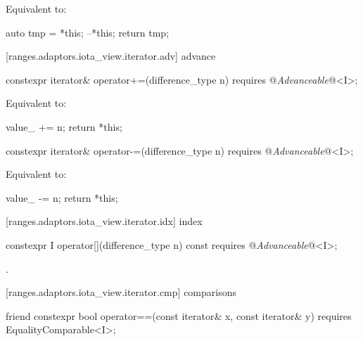 \begin{itemdescr}
\pnum
\effects Equivalent to:
\begin{codeblock}
auto tmp = *this;
--*this;
return tmp;
\end{codeblock}
\end{itemdescr}

[ranges.adaptors.iota_view.iterator.adv]{ advance}

\begin{itemdecl}
constexpr iterator& operator+=(difference_type n)
  requires @\textit{Advanceable}@<I>;
\end{itemdecl}

\begin{itemdescr}
\pnum
\effects Equivalent to:
\begin{codeblock}
value_ += n;
return *this;
\end{codeblock}
\end{itemdescr}

\begin{itemdecl}
constexpr iterator& operator-=(difference_type n)
  requires @\textit{Advanceable}@<I>;
\end{itemdecl}

\begin{itemdescr}
\pnum
\effects Equivalent to:
\begin{codeblock}
value_ -= n;
return *this;
\end{codeblock}
\end{itemdescr}

[ranges.adaptors.iota_view.iterator.idx]{ index}

\begin{itemdecl}
constexpr I operator[](difference_type n) const
  requires @\textit{Advanceable}@<I>;
\end{itemdecl}

\begin{itemdescr}
\pnum
\returns {}.
\end{itemdescr}

[ranges.adaptors.iota_view.iterator.cmp]{ comparisons}

\begin{itemdecl}
friend constexpr bool operator==(const iterator& x, const iterator& y)
  requires EqualityComparable<I>;
\end{itemdecl}

